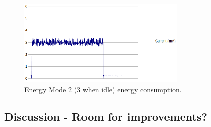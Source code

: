 \begin{figure}[hf]
	\centering
	\includegraphics[width=8cm]{img/em3_sleep.png}
	\caption{Energy Mode 2 (3 when idle) energy consumption.}
	\label{fig:em3_sleep}
\end{figure}
\subsection{Discussion - Room for improvements?}

